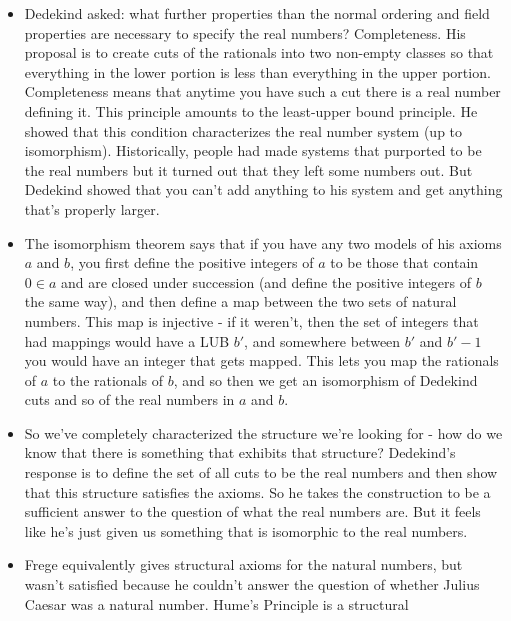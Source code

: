 \documentclass[12pt]{article}
\theoremstyle{definition}
\begin{document}
\begin{itemize}
    \item
        Dedekind asked: what further properties than the normal ordering and
        field properties are necessary to specify the real numbers?
        Completeness. His proposal is to create cuts of the rationals into two
        non-empty classes so that everything in the lower portion is less than
        everything in the upper portion. Completeness means that anytime you
        have such a cut there is a real number defining it. This principle
        amounts to the least-upper bound principle. He showed that this
        condition characterizes the real number system (up to isomorphism).
        Historically, people had made systems that purported to be the real
        numbers but it turned out that they left some numbers out. But Dedekind
        showed that you can't add anything to his system and get anything
        that's properly larger. 
    \item
        The isomorphism theorem says that if you have any two models of his
        axioms $a$ and $b$, you first define the positive integers of $a$ to be
        those that contain $0 \in a$ and are closed under succession (and
        define the positive integers of $b$ the same way), and then define a
        map between the two sets of natural numbers. This map is injective - if
        it weren't, then the set of integers that had mappings would have a LUB
        $b'$, and somewhere between $b'$ and $b' - 1$ you would have an integer
        that gets mapped. This lets you map the rationals of $a$ to the
        rationals of $b$, and so then we get an isomorphism of Dedekind cuts
        and so of the real numbers in $a$ and $b$. 
    \item
        So we've completely characterized the structure we're looking for - how
        do we know that there is something that exhibits that structure?
        Dedekind's response is to define the set of all cuts to be the real
        numbers and then show that this structure satisfies the axioms. So he
        takes the construction to be a sufficient answer to the question of
        what the real numbers are. But it feels like he's just given us
        something that is isomorphic to the real numbers. 
    \item
        Frege equivalently gives structural axioms for the natural numbers, but
        wasn't satisfied because he couldn't answer the question of whether
        Julius Caesar was a natural number. Hume's Principle is a structural

\end{itemize}
\end{document}
